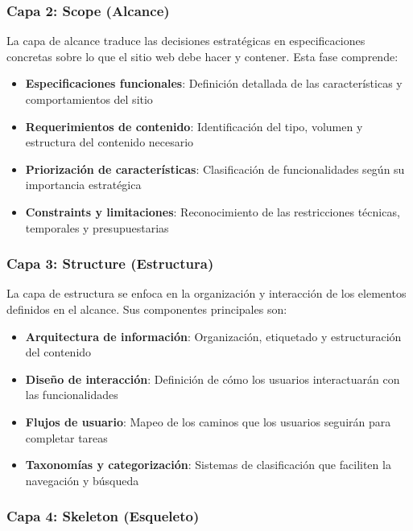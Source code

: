 \subsubsection{Capa 2: Scope (Alcance)}

La capa de alcance traduce las decisiones estratégicas en especificaciones concretas sobre lo que el sitio web debe hacer y contener. Esta fase comprende:

\begin{itemize}
    \item \textbf{Especificaciones funcionales}: Definición detallada de las características y comportamientos del sitio
    \item \textbf{Requerimientos de contenido}: Identificación del tipo, volumen y estructura del contenido necesario
    \item \textbf{Priorización de características}: Clasificación de funcionalidades según su importancia estratégica
    \item \textbf{Constraints y limitaciones}: Reconocimiento de las restricciones técnicas, temporales y presupuestarias
\end{itemize}

\subsubsection{Capa 3: Structure (Estructura)}

La capa de estructura se enfoca en la organización y interacción de los elementos definidos en el alcance. Sus componentes principales son:

\begin{itemize}
    \item \textbf{Arquitectura de información}: Organización, etiquetado y estructuración del contenido
    \item \textbf{Diseño de interacción}: Definición de cómo los usuarios interactuarán con las funcionalidades
    \item \textbf{Flujos de usuario}: Mapeo de los caminos que los usuarios seguirán para completar tareas
    \item \textbf{Taxonomías y categorización}: Sistemas de clasificación que faciliten la navegación y búsqueda
\end{itemize}

\subsubsection{Capa 4: Skeleton (Esqueleto)}

